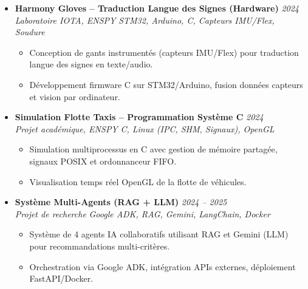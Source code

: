 \documentclass[a4paper,11pt]{article}
\begin{document}
\begin{itemize}[leftmargin=*, label={-}]
\item \textbf{Harmony Gloves -- Traduction Langue des Signes (Hardware)} \hfill \textit{2024} \\
\textit{Laboratoire IOTA, ENSPY} \hfill \textit{STM32, Arduino, C, Capteurs IMU/Flex, Soudure}
\vspace{-2pt}
    \begin{itemize}[leftmargin=0.4cm, nosep, label=\tiny$\bullet$]
        \item \small{Conception de gants instrumentés (capteurs IMU/Flex) pour traduction langue des signes en texte/audio.}
        \item \small{Développement firmware C sur STM32/Arduino, fusion données capteurs et vision par ordinateur.}
    \end{itemize}
\vspace{3pt}

\item \textbf{Simulation Flotte Taxis -- Programmation Système C} \hfill \textit{2024} \\
\textit{Projet académique, ENSPY} \hfill \textit{C, Linux (IPC, SHM, Signaux), OpenGL}
\vspace{-2pt}
    \begin{itemize}[leftmargin=0.4cm, nosep, label=\tiny$\bullet$]
        \item \small{Simulation multiprocessus en C avec gestion de mémoire partagée, signaux POSIX et ordonnanceur FIFO.}
        \item \small{Visualisation temps réel OpenGL de la flotte de véhicules.}
    \end{itemize}
\vspace{3pt}

\item \textbf{Système Multi-Agents (RAG + LLM)} \hfill \textit{2024 -- 2025} \\
\textit{Projet de recherche} \hfill \textit{Google ADK, RAG, Gemini, LangChain, Docker}
\vspace{-2pt}
    \begin{itemize}[leftmargin=0.4cm, nosep, label=\tiny$\bullet$]
        \item \small{Système de 4 agents IA collaboratifs utilisant RAG et Gemini (LLM) pour recommandations multi-critères.}
        \item \small{Orchestration via Google ADK, intégration APIs externes, déploiement FastAPI/Docker.}
    \end{itemize}
\vspace{3pt}

\end{itemize}
\end{document}

